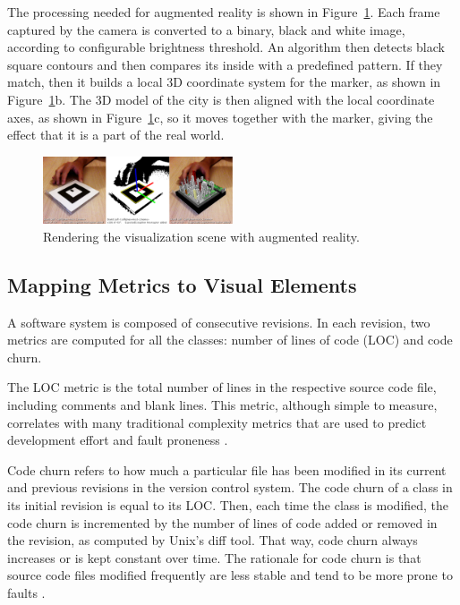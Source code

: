 The processing needed for augmented reality is shown in Figure~\ref{fig:rendering_visualization}. Each frame captured by the camera is converted to a binary, black and white image, according to configurable brightness threshold. An algorithm then detects black square contours and then compares its inside with a predefined pattern. If they match, then it builds a local 3D coordinate system for the marker, as shown in Figure~\ref{fig:rendering_visualization}b. The 3D model of the city is then aligned with the local coordinate axes, as shown in Figure~\ref{fig:rendering_visualization}c, so it moves together with the marker, giving the effect that it is a part of the real world.

\begin{figure}[ht!]
 \centering
 \includegraphics[width=0.5\textwidth, bb=14 14 1343 490]{./images/visualizationRedering}
 \caption{Rendering the visualization scene with augmented reality.}
 \label{fig:rendering_visualization}
\end{figure}

\subsection{Mapping Metrics to Visual Elements} \label{sec:metrics_visual_elements}
A software system is composed of consecutive revisions. In each revision, two metrics are computed for all the classes: number of lines of code (LOC) and code churn. 

The LOC metric is the total number of lines in the respective source code file, including comments and blank lines. This metric, although simple to measure, correlates with many traditional complexity metrics that are used to predict development effort and fault proneness \cite{elemam:2001}.

Code churn refers to how much a particular file has been modified in its current and previous revisions in the version control system. The code churn of a class in its initial revision is equal to its LOC. Then, each time the class is modified, the code churn is incremented by the number of lines of code added or removed in the revision, as computed by Unix's diff tool. That way, code churn always increases or is kept constant over time. The rationale for code churn is that source code files modified frequently are less stable and tend to be more prone to faults \cite{nagappan:2005}.

